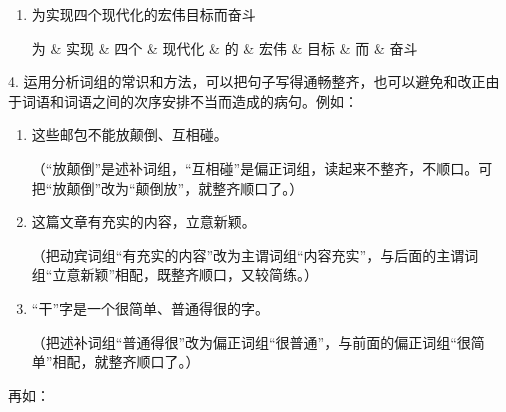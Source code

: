 \begin{enumerate}[label=\textcircled{\arabic*}]
\begin{dependency}[theme = simple, edge unit distance=0.5em]
	\begin{deptext}[column sep=0.5em]
		对 \& 于 \& 顽抗 \& 到底 \& 的 \& 统统 \& 消灭\\
	\end{deptext}
\end{dependency}
\newpage

\item 为实现四个现代化的宏伟目标而奋斗

\begin{dependency}[theme = simple, edge unit distance=0.5em]
	\begin{deptext}[column sep=0.5em]
		为 \& 实现 \& 四个 \& 现代化 \&  的 \& 宏伟 \& 目标 \& 而 \& 奋斗\\
	\end{deptext}
\end{dependency}
\end{enumerate}

4. 运用分析词组的常识和方法，可以把句子写得通畅整齐，也可以避免和改正由于词语和词语之间的次序安排不当而造成的病句。例如：

\begin{enumerate}[label=\textcircled{\arabic*}]
\item 这些邮包不能放颠倒、互相碰。

（“放颠倒”是述补词组，“互相碰”是偏正词组，读起来不整齐，不顺口。可把“放颠倒”改为“颠倒放”，就整齐顺口了。）

\item 这篇文章有充实的内容，立意新颖。

（把动宾词组“有充实的内容”改为主谓词组“内容充实”，与后面的主谓词组“立意新颖”相配，既整齐顺口，又较简练。）

\item “干”字是一个很简单、普通得很的字。

（把述补词组“普通得很”改为偏正词组“很普通”，与前面的偏正词组“很简单”相配，就整齐顺口了。）
\end{enumerate}
\newpage

再如：

